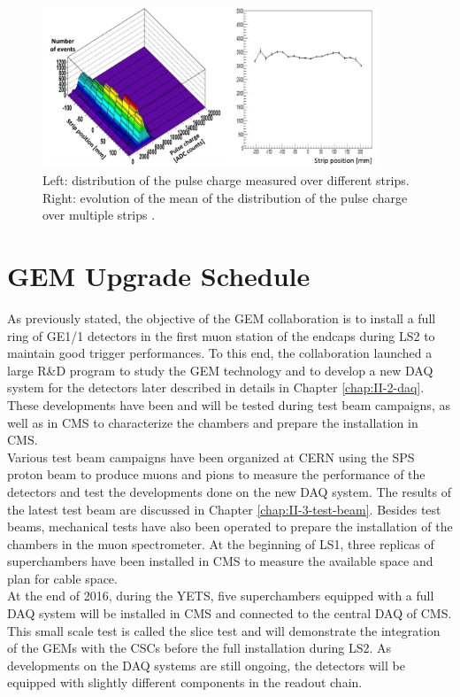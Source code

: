       \begin{figure}[b!]
        \centering
        \includegraphics[width=0.9\textwidth]{img/II-1-gem/uniformity.png}
        \caption{Left: distribution of the pulse charge measured over different strips. Right: evolution of the mean of the distribution of the pulse charge over multiple strips \cite{Colaleo:2021453}.}
        \label{fig:II-1-uniformity}
      \end{figure}

  \section{GEM Upgrade Schedule}

    As previously stated, the objective of the GEM collaboration is to install a full ring of GE1/1 detectors in the first muon station of the endcaps during LS2 to maintain good trigger performances. To this end, the collaboration launched a large R\&D program to study the GEM technology and to develop a new DAQ system for the detectors later described in details in Chapter \ref{chap:II-2-daq}. These developments have been and will be tested during test beam campaigns, as well as in CMS to characterize the chambers and prepare the installation in CMS. \\

    Various test beam campaigns have been organized at CERN using the SPS proton beam to produce muons and pions to measure the performance of the detectors and test the developments done on the new DAQ system. The results of the latest test beam are discussed in Chapter \ref{chap:II-3-test-beam}. Besides test beams, mechanical tests have also been operated to prepare the installation of the chambers in the muon spectrometer. At the beginning of LS1, three replicas of superchambers have been installed in CMS to measure the available space and plan for cable space. \\

    At the end of 2016, during the YETS, five superchambers equipped with a full DAQ system will be installed in CMS and connected to the central DAQ of CMS. This small scale test is called the slice test and will demonstrate the integration of the GEMs with the CSCs before the full installation during LS2. As developments on the DAQ systems are still ongoing, the detectors will be equipped with slightly different components in the readout chain. \\

